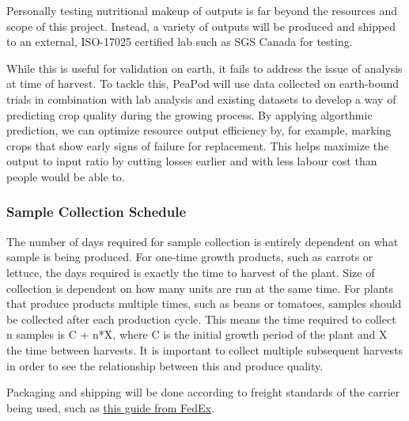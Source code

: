 Personally testing nutritional makeup of outputs is far beyond the resources and scope of this project. Instead, a variety of outputs will be produced and shipped to an external, ISO-17025 certified lab such as SGS Canada for testing.

While this is useful for validation on earth, it fails to address the issue of analysis at time of harvest. To tackle this, PeaPod will use data collected on earth-bound trials in combination with lab analysis and existing datasets to develop a way of predicting crop quality during the growing process. By applying algorthmic prediction, we can optimize resource output efficiency by, for example, marking crops that show early signs of failure for replacement. This helps maximize the output to input ratio by cutting losses earlier and with less labour cost than people would be able to.



\subsubsection{Sample Collection Schedule}

The number of days required for sample collection is entirely dependent on what sample is being produced. For one-time growth products, such as carrots or lettuce, the days required is exactly the time to harvest of the plant. Size of collection is dependent on how many units are run at the same time. For plants that produce products multiple times, such as beans or tomatoes, samples should be collected after each production cycle. This means the time required to collect n samples is C + n*X, where C is the initial growth period of the plant and X the time between harvests. It is important to collect multiple subsequent harvests in order to see the relationship between this and produce quality.

Packaging and shipping will be done according to freight standards of the carrier being used, such as \href{https://www.fedex.com/en-us/shipping/how-to-ship-perishables.html#1}{this guide from FedEx}. 

